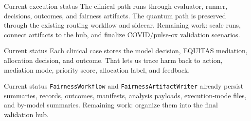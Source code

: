 \begin{block}{Current execution status}
The clinical path runs through evaluator, runner, decisions, outcomes, and fairness artifacts. The quantum path is preserved through the existing routing workflow and sidecar. Remaining work: scale runs, connect artifacts to the hub, and finalize COVID/pulse-ox validation scenarios.
\end{block}

\begin{block}{Current status}
Each clinical case stores the model decision, EQUITAS mediation, allocation decision, and outcome. That lets us trace harm back to action, mediation mode, priority score, allocation label, and feedback.
\end{block}

\begin{block}{Current status}
\texttt{FairnessWorkflow} and \texttt{FairnessArtifactWriter} already persist summaries, records, outcomes, manifests, analysis payloads, execution-mode files, and by-model summaries. Remaining work: organize them into the final validation hub.
\end{block}

